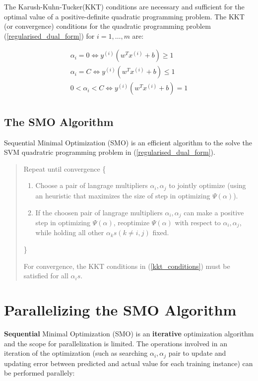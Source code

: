 \documentclass{article}
\begin{document}
		The Karush-Kuhn-Tucker(KKT) conditions are necessary and sufficient for the optimal value of a positive-definite quadratic programming problem. The KKT (or convergence) conditions for the quadratic programming problem (\ref{regularised_dual_form}) for $i=1, \ldots, m$ are:
		
		\begin{equation}
			\label{kkt_conditions}
			\begin{aligned}
				\alpha_i = 0 \iff y^{(i)} (w^T x^{(i)} + b) \geq 1 \\
				\alpha_i = C \iff y^{(i)} (w^T x^{(i)} + b) \leq 1 \\
				0 < \alpha_i < C \iff y^{(i)} (w^T x^{(i)} + b) = 1 \\
			\end{aligned}
		\end{equation}
		
	\subsection{The SMO Algorithm}
		
		Sequential Minimal Optimization (SMO) is an efficient algorithm to the solve the SVM quadratric programming problem in (\ref{regularised_dual_form}).
		
		\begin{quote}
			Repeat until convergence \{
				\begin{enumerate}
					\item Choose a pair of langrage multipliers $\alpha_i, \alpha_j$ to jointly optimize (using an heuristic that maximizes the size of step in optimizing $\Psi(\alpha)$).
					\item If the choosen pair of langrage multipliers $\alpha_i, \alpha_j$ can make a positive step in optimizing $\Psi(\alpha)$, reoptimize $\Psi(\alpha)$ with respect to $\alpha_i, \alpha_j$, while holding all other $\alpha_k s(k \neq i,j)$ fixed.
				\end{enumerate}
			\}
			
			For convergence, the KKT conditions in (\ref{kkt_conditions}) must be satisfied for all $\alpha_i s$.
		\end{quote}
		
\section{Parallelizing the SMO Algorithm}
	
	\textbf{Sequential} Minimal Optimization (SMO) is an \textbf{iterative} optimization algorithm and the scope for parallelization is limited. The operations involved in an iteration of the optimization (such as searching $\alpha_i, \alpha_j$ pair to update and updating error between predicted and actual value for each training instance) can be performed parallely:
	
\end{document}

